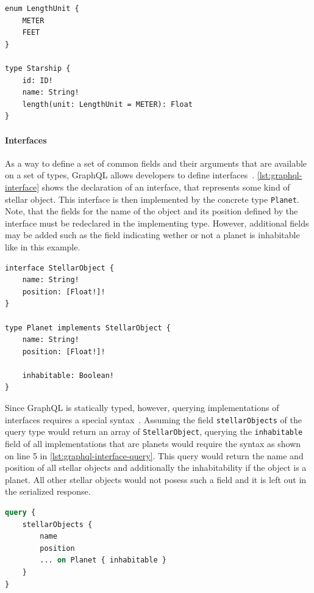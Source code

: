 \begin{lstlisting}[caption={Enumeration Types and Arguments on GraphQL Fields}, language=graphqls, label={lst:graphql-enum}]
enum LengthUnit {
    METER
    FEET
}

type Starship {
    id: ID!
    name: String!
    length(unit: LengthUnit = METER): Float
}
\end{lstlisting}

\paragraph{Interfaces}

As a way to define a set of common fields and their arguments that are available on a set of types, GraphQL allows developers to define interfaces~\cite{Facebook2018}.
\autoref{lst:graphql-interface} shows the declaration of an interface, that represents some kind of stellar object.
This interface is then implemented by the concrete type \texttt{Planet}.
Note, that the fields for the name of the object and its position defined by the interface must be redeclared in the implementing type.
However, additional fields may be added such as the field indicating wether or not a planet is inhabitable like in this example.

\begin{lstlisting}[caption={Interfaces in GraphQL Schemas}, language=graphqls, label={lst:graphql-interface}]
interface StellarObject {
    name: String!
    position: [Float!]!
}

type Planet implements StellarObject {
    name: String!
    position: [Float!]!

    inhabitable: Boolean!
}
\end{lstlisting}

Since GraphQL is statically typed, however, querying implementations of interfaces requires a special syntax~\cite{Facebook2018}.
Assuming the field \texttt{stellarObjects} of the query type would return an array of \texttt{StellarObject}, querying the \texttt{inhabitable} field of all implementations that are planets would require the syntax as shown on line 5 in \autoref{lst:graphql-interface-query}.
This query would return the name and position of all stellar objects and additionally the inhabitability if the object is a planet.
All other stellar objects would not posess such a field and it is left out in the serialized response.

\begin{lstlisting}[caption={Querying Interfaces in GraphQL}, language=graphql, label={lst:graphql-interface-query}]
query {
    stellarObjects {
        name
        position
        ... on Planet { inhabitable }
    }
}
\end{lstlisting}


